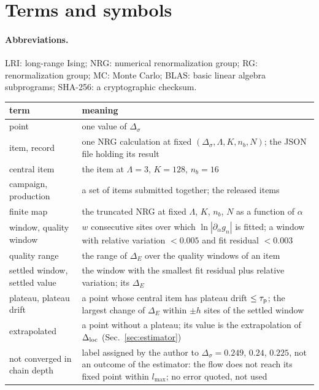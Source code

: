 \documentclass[10pt,a4paper]{article}
\newcommand{\Ds}{\Delta_\sigma}
\newcommand{\DE}{\Delta_E}
\newcommand{\Dloc}{\Delta_{\rm loc}}
\begin{document}
\section{Terms and symbols}\label{app:symbols}
\paragraph{Abbreviations.} LRI: long-range Ising; NRG: numerical renormalization group; RG: renormalization group; MC: Monte Carlo;
BLAS: basic linear algebra subprograms; SHA-256: a cryptographic checksum.

\begin{longtable}{@{}>{\raggedright\arraybackslash}p{3.4cm}p{12.2cm}@{}}\toprule
term & meaning\\\midrule\endhead
point & one value of $\Ds$\\
item, record & one NRG calculation at fixed $(\Ds,\Lambda,K,n_b,N)$; the JSON file holding its result\\
central item & the item at $\Lambda=3$, $K=128$, $n_b=16$\\
campaign, production & a set of items submitted together; the released items\\
finite map & the truncated NRG at fixed $\Lambda$, $K$, $n_b$, $N$ as a function of $\alpha$\\
window, quality window & $w$ consecutive sites over which $\ln|\partial_\alpha g_n|$ is fitted; a window with relative variation $<0.005$ and fit residual $<0.003$\\
quality range & the range of $\DE$ over the quality windows of an item\\
settled window, settled value & the window with the smallest fit residual plus relative variation; its $\DE$\\
plateau, plateau drift & a point whose central item has plateau drift $\le\tau_{\rm p}$; the largest change of $\DE$ within $\pm h$ sites of the settled window\\
extrapolated & a point without a plateau; its value is the extrapolation of $\Dloc$ (Sec.~\ref{sec:estimator})\\
not converged in chain depth & label assigned by the author to $\Ds=0.249$, $0.24$, $0.225$, not an outcome of the estimator: the flow does not reach its fixed point within $l_{\max}$; no error quoted, not used\\

\end{longtable}
\end{document}
